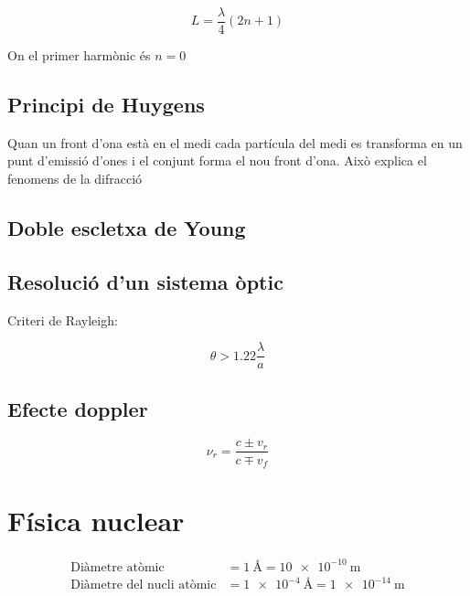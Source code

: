 \begin{equation}
    L = \frac{\lambda}{4}(2n+1)
\end{equation}

On el primer harmònic és $n=0$

\subsection{Principi de Huygens}
\label{sub:principi_de_huygens}

Quan un front d'ona està en el medi cada partícula del medi es transforma en
un punt d'emissió d'ones i el conjunt forma el nou front d'ona. Això explica el
fenomens de la difracció

\subsection{Doble escletxa de Young}
\label{sub:doble_escletxa_de_young}

\subsection{Resolució d'un sistema òptic}
\label{sub:resolucio_d_un_sistema_optic}

Criteri de Rayleigh:

\begin{equation}
    \theta > 1.22 \frac{\lambda}{a}
\end{equation}

\subsection{Efecte doppler}
\label{sub:efecte_doppler}

\begin{equation}
    \nu_r  = \frac{c \pm v_r}{c \mp v_f}
\end{equation}


\section{Física nuclear}
\label{sec:fisica_nuclear}

\begin{align}
    \text{Diàmetre atòmic} &= \SI{1}{\angstrom} = \SI{10e-10}{\metre} \\
    \text{Diàmetre del nucli atòmic} &= \SI{1e-4}{\angstrom} = \SI{1e-14}{\metre}
\end{align}

